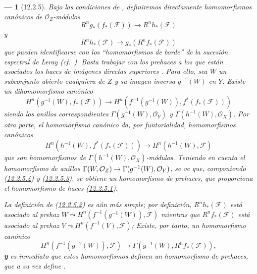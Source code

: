 \documentclass[10pt,oneside,openany]{book}
\theoremstyle{egaenv}\newtheorem*{env}{---}
\theoremstyle{egastatement}
\theoremstyle{egadescription}
\newcommand{\oldpage}[2][]{\marginnote{\normalfont\scriptsize\textbf{#1}\,|\,#2}\ignorespaces}
\renewcommand{\to}{\mathchoice{\longrightarrow}{\rightarrow}{\rightarrow}{\rightarrow}}
\begin{document}
\begin{env}[12.2.5]
\label{0.12.2.5}
\label{0.12.2.5-fr}
Bajo las condiciones de , definiremos directamente
homomorfismos canónicos de $\mathcal O_Z$-módulos
\[
\label{0.12.2.5.1-fr}
\tag{12.2.5.1}
R^n g_*(f_*(\mathcal F))\longrightarrow R^n h_*(\mathcal F)
\]
y
\[
\label{0.12.2.5.2-fr}
\tag{12.2.5.2}
R^n h_*(\mathcal F)\longrightarrow g_*(R^n f_*(\mathcal F))
\]
\oldpage[0\textsubscript{III}]{59}
que pueden identificarse con los ``homomorfismos de borde'' de la sucesión
espectral de Leray (cf.\ ).
Basta trabajar con los prehaces a los que están asociados los haces de
imágenes directas superiores .
Para ello, sea $W$ un subconjunto abierto cualquiera de $Z$ y su imagen inversa $g^{-1}(W)$ en $Y$.  Existe un
dihomomorfismo canónico
\[
\label{0.12.2.5.3-fr}
\tag{12.2.5.3}
H^n(g^{-1}(W),f_*(\mathcal F))\longrightarrow
H^n(f^{-1}(g^{-1}(W)),f^*(f_*(\mathcal F)))
\]
siendo los anillos correspondientes
$\Gamma(g^{-1}(W),\mathcal O_Y)$ y
$\Gamma(h^{-1}(W),\mathcal O_X)$.
Por otra parte, el homomorfismo canónico
 da, por funtorialidad,
homomorfismos canónicos
\[
\label{0.12.2.5.4-fr}
\tag{12.2.5.4}
H^n(h^{-1}(W),f^*(f_*(\mathcal F)))\longrightarrow
H^n(h^{-1}(W),\mathcal F)
\]
que son homomorfismos de
$\Gamma(h^{-1}(W),\mathcal O_X)$-módulos.
Teniendo en cuenta el homomorfismo de anillos
$\Gamma(W,\mathcal O_Z)\to\Gamma(g^{-1}(W),\mathcal O_Y)$, se ve que, componiendo (\hyperref[0.12.2.5.4-fr]{12.2.5.4}) y (\hyperref[0.12.2.5.3-fr]{12.2.5.3}), se obtiene un homomorfismo de prehaces, que proporciona el homomorfismo de haces (\hyperref[0.12.2.5.1-fr]{12.2.5.1}).

La definición de (\hyperref[0.12.2.5.2-fr]{12.2.5.2}) es aún más simple; por definición, $R^n h_*(\mathcal F)$ está asociado al prehaz
$W\leadsto H^n(f^{-1}(g^{-1}(W)),\mathcal F)$
mientras que $R^n f_*(\mathcal F)$ está asociado al prehaz
$V\leadsto H^n(f^{-1}(V),\mathcal F)$;
Existe, por tanto, un homomorfismo canónico
\[
H^n(f^{-1}(g^{-1}(W)),\mathcal F)\longrightarrow
\Gamma(g^{-1}(W),R^n f_*(\mathcal F)),
\]
\textbf{y} es inmediato que estos homomorfismos definen un homomorfismo de
prehaces, que a su vez define .
\end{env}
\end{document}
